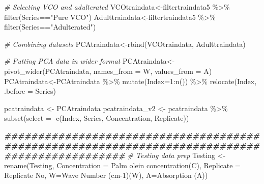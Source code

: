 \documentclass[
]{article}
\newenvironment{Shaded}{\begin{snugshade}}{\end{snugshade}}
\newcommand{\AttributeTok}[1]{\textcolor[rgb]{0.77,0.63,0.00}{#1}}
\newcommand{\CommentTok}[1]{\textcolor[rgb]{0.56,0.35,0.01}{\textit{#1}}}
\newcommand{\DecValTok}[1]{\textcolor[rgb]{0.00,0.00,0.81}{#1}}
\newcommand{\DocumentationTok}[1]{\textcolor[rgb]{0.56,0.35,0.01}{\textbf{\textit{#1}}}}
\newcommand{\FunctionTok}[1]{\textcolor[rgb]{0.00,0.00,0.00}{#1}}
\newcommand{\NormalTok}[1]{#1}
\newcommand{\OtherTok}[1]{\textcolor[rgb]{0.56,0.35,0.01}{#1}}
\newcommand{\SpecialCharTok}[1]{\textcolor[rgb]{0.00,0.00,0.00}{#1}}
\newcommand{\StringTok}[1]{\textcolor[rgb]{0.31,0.60,0.02}{#1}}
\begin{document}
\begin{Shaded}
\begin{Highlighting}[]
  \CommentTok{\# Selecting VCO and adulterated}
\NormalTok{  VCOtraindata}\OtherTok{\textless{}{-}}\NormalTok{filtertraindata5 }\SpecialCharTok{\%\textgreater{}\%} \FunctionTok{filter}\NormalTok{(Series}\SpecialCharTok{==}\StringTok{"Pure VCO"}\NormalTok{)}
\NormalTok{  Adulttraindata}\OtherTok{\textless{}{-}}\NormalTok{filtertraindata5 }\SpecialCharTok{\%\textgreater{}\%} \FunctionTok{filter}\NormalTok{(Series}\SpecialCharTok{==}\StringTok{"Adulterated"}\NormalTok{)}
  
  \CommentTok{\# Combining datasets}
\NormalTok{  PCAtraindata}\OtherTok{\textless{}{-}}\FunctionTok{rbind}\NormalTok{(VCOtraindata, Adulttraindata)}
  
  \CommentTok{\# Putting PCA data in wider format}
\NormalTok{  PCAtraindata}\OtherTok{\textless{}{-}}\FunctionTok{pivot\_wider}\NormalTok{(PCAtraindata, }\AttributeTok{names\_from =}\NormalTok{ W, }\AttributeTok{values\_from =}\NormalTok{ A)}
\NormalTok{  PCAtraindata}\OtherTok{\textless{}{-}}\NormalTok{PCAtraindata }\SpecialCharTok{\%\textgreater{}\%} \FunctionTok{mutate}\NormalTok{(}\AttributeTok{Index=}\DecValTok{1}\SpecialCharTok{:}\FunctionTok{n}\NormalTok{()) }\SpecialCharTok{\%\textgreater{}\%} \FunctionTok{relocate}\NormalTok{(Index, }\AttributeTok{.before =}\NormalTok{ Series)}
  
\NormalTok{  pcatraindata }\OtherTok{\textless{}{-}}\NormalTok{  PCAtraindata}
\NormalTok{  pcatraindata\_v2 }\OtherTok{\textless{}{-}}\NormalTok{ pcatraindata }\SpecialCharTok{\%\textgreater{}\%} \FunctionTok{subset}\NormalTok{(}\AttributeTok{select =} \SpecialCharTok{{-}}\FunctionTok{c}\NormalTok{(Index, Series, Concentration, Replicate))}
  
  \DocumentationTok{\#\#\#\#\#\#\#\#\#\#\#\#\#\#\#\#\#\#\#\#\#\#\#\#\#\#\#\#\#\#\#\#\#\#\#\#\#\#\#\#\#\#\#\#\#\#\#\#\#\#\#\#\#\#\#\#\#\#\#\#\#\#\#\#\#\#\#\#\#\#\#\#\#\#\#\#\#\#\#\#\#\#\#\#\#\#\#\#\#\#\#\#\#\#}
  \CommentTok{\# Testing data prep}
\NormalTok{  Testing }\OtherTok{\textless{}{-}} \FunctionTok{rename}\NormalTok{(Testing, }\AttributeTok{Concentration =} \StringTok{\textasciigrave{}}\AttributeTok{Palm olein concentration(C)}\StringTok{\textasciigrave{}}\NormalTok{, }
                    \AttributeTok{Replicate =} \StringTok{\textasciigrave{}}\AttributeTok{Replicate No}\StringTok{\textasciigrave{}}\NormalTok{, }\AttributeTok{W=}\StringTok{\textasciigrave{}}\AttributeTok{Wave Number (cm{-}1)(W)}\StringTok{\textasciigrave{}}\NormalTok{, }\AttributeTok{A=}\StringTok{\textasciigrave{}}\AttributeTok{Absorption (A)}\StringTok{\textasciigrave{}}\NormalTok{)}
  

\end{Highlighting}
\end{Shaded}
\end{document}
